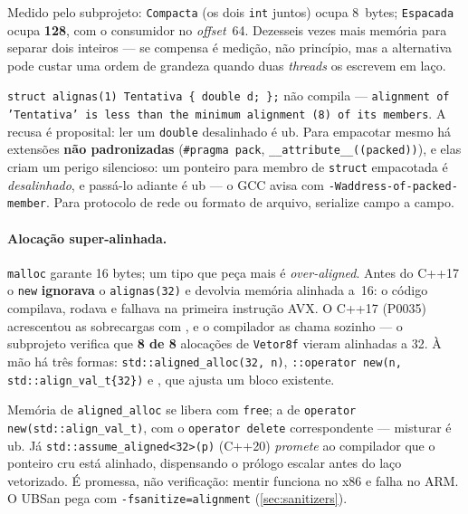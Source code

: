 Medido pelo subprojeto: \texttt{Compacta} (os dois \texttt{int} juntos) ocupa
8~bytes; \texttt{Espacada} ocupa \textbf{128}, com o consumidor no
\emph{offset}~64. Dezesseis vezes mais memória para separar dois inteiros --- se
compensa é medição, não princípio, mas a alternativa pode custar uma ordem de
grandeza quando duas \emph{threads} os escrevem em laço.

\begin{armadilha}
\texttt{struct alignas(1) Tentativa \{ double d; \};} não compila ---
\texttt{alignment of 'Tentativa' is less than the minimum alignment (8) of its
members}. A recusa é proposital: ler um \texttt{double} desalinhado é \gls{ub}.
Para empacotar mesmo há extensões \textbf{não padronizadas}
(\texttt{\#pragma pack}, \texttt{\_\_attribute\_\_((packed))}), e elas criam um
perigo silencioso: um ponteiro para membro de \texttt{struct} empacotada é
\emph{desalinhado}, e passá-lo adiante é \gls{ub} --- o GCC avisa com
\texttt{-Waddress-of-packed-member}. Para protocolo de rede ou formato de
arquivo, serialize campo a campo.
\end{armadilha}

\paragraph{Alocação super-alinhada.} \texttt{malloc} garante 16 bytes; um tipo
que peça mais é \emph{over-aligned}. Antes do C++17 o \texttt{new}
\textbf{ignorava} o \texttt{alignas(32)} e devolvia memória alinhada a~16: o
código compilava, rodava e falhava na primeira instrução AVX. O C++17 (P0035)
acrescentou as sobrecargas com , e o compilador as
chama sozinho --- o subprojeto verifica que \textbf{8 de 8} alocações de
\texttt{Vetor8f} vieram alinhadas a 32. À mão há três formas:
\texttt{std::aligned\_alloc(32, n)}, \texttt{::operator new(n,
std::align\_val\_t\{32\})} e , que ajusta um bloco existente.

\begin{armadilha}
Memória de \texttt{aligned\_alloc} se libera com \texttt{free}; a de
\texttt{operator new(std::align\_val\_t)}, com o \texttt{operator delete}
correspondente --- misturar é \gls{ub}. Já
\texttt{std::assume\_aligned<32>(p)} (C++20) \emph{promete} ao compilador que o
ponteiro cru está alinhado, dispensando o prólogo escalar antes do laço
vetorizado. É promessa, não verificação: mentir funciona no x86 e falha no ARM.
O UBSan pega com \texttt{-fsanitize=alignment} (\cref{sec:sanitizers}).
\end{armadilha}

